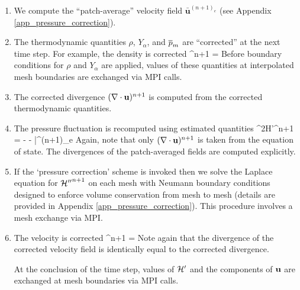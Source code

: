\documentclass[11pt]{book}
\begin{document}
\begin{enumerate}
\item We compute the ``patch-average'' velocity field $\bar{\mathbf{u}}^{(n+1)_e}$ (see Appendix \ref{app_pressure_correction}).

\item The thermodynamic quantities $\rho$, $Y_\alpha$, and $\overline{p}_m$ are ``corrected'' at the next time step. For example, the density is corrected
\be
\rho^{n+1} = \ha {}
\ee
Before boundary conditions for $\rho$ and $Y_\alpha$ are applied, values of these quantities at
interpolated mesh boundaries are exchanged via MPI calls.

\item The corrected divergence $(\nabla \cdot {\bf u})^{n+1}$ is computed from the
corrected thermodynamic quantities.

\item The pressure fluctuation is recomputed using estimated quantities
\be
\label{eqn_corrector_poisson2}
\nabla^2{\cal H'}^{n+1} = -  - \nabla \cdot \bar{}^{(n+1)_e}
\ee
Again, note that only $(\nabla\cdot{\bf u})^{n+1}$ is taken from the equation of state.  The divergences of the patch-averaged fields are computed explicitly.

\item If the `pressure correction' scheme is invoked then we solve the Laplace equation for ${{\cal H}''}^{n+1}$ on each mesh with Neumann boundary conditions designed to enforce volume conservation from mesh to mesh (details are provided in Appendix \ref{app_pressure_correction}).  This procedure involves a mesh exchange via MPI.

\item The velocity is corrected
\be
\bu^{n+1} = \ha {}
\ee
Note again that the divergence of the corrected velocity field is identically equal to the corrected divergence.

At the conclusion of the time step, values of $\cal H'$ and the components of ${\bf u}$ are exchanged at mesh boundaries via MPI calls.

\end{enumerate}
\end{document}

